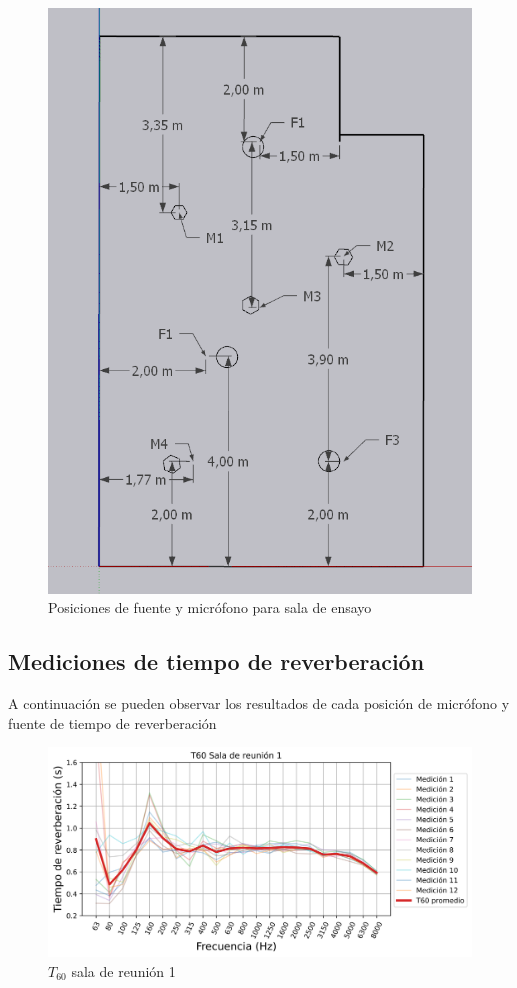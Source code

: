 \begin{figure}[H]
    \centering
    \includegraphics[scale=0.4]{Imagenes/PosicionesRT/Posiciones Sala OCV.png}
    \caption{Posiciones de fuente y micrófono para sala de ensayo}
    \label{fig: posiciones sala OCV}
\end{figure}

\subsection{Mediciones de tiempo de reverberación}
A continuación se pueden observar los resultados de cada posición de micrófono y fuente de tiempo de reverberación
\begin{figure}[H]
    \centering
    \includegraphics[width=12cm]{Imagenes/Resultados/T60_Sala_reunion_1.png}
    \caption{$T_{60}$ sala de reunión 1}
    \label{fig: T60 sala1}
\end{figure}

